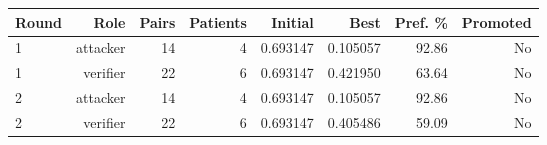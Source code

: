 \begin{tabular}{lrrrrrrr}
\toprule
Round & Role & Pairs & Patients & Initial & Best & Pref. \% & Promoted \\
\midrule
1 & attacker & 14 & 4 & 0.693147 & 0.105057 & 92.86 & No \\
1 & verifier & 22 & 6 & 0.693147 & 0.421950 & 63.64 & No \\
2 & attacker & 14 & 4 & 0.693147 & 0.105057 & 92.86 & No \\
2 & verifier & 22 & 6 & 0.693147 & 0.405486 & 59.09 & No \\
\bottomrule
\end{tabular}
